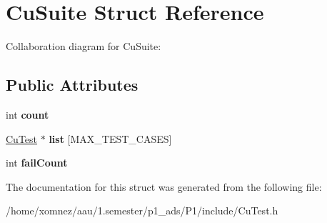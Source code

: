 \hypertarget{structCuSuite}{}\section{Cu\+Suite Struct Reference}
\label{structCuSuite}


Collaboration diagram for Cu\+Suite\+:
\subsection*{Public Attributes}
\begin{DoxyCompactItemize}
\item 
\mbox{\label{structCuSuite_a44b3a5aa4c9b027a6c680c78cdcb9da4}} 
int {\bfseries count}
\item 
\mbox{\label{structCuSuite_a16efbf8411fefbfe58e3c1f7f741241c}} 
\hyperlink{structCuTest}{Cu\+Test} $\ast$ {\bfseries list} \mbox{[}M\+A\+X\+\_\+\+T\+E\+S\+T\+\_\+\+C\+A\+S\+ES\mbox{]}
\item 
\mbox{\label{structCuSuite_ac768ec100a0423c8e9e9a0859c5c5dbd}} 
int {\bfseries fail\+Count}
\end{DoxyCompactItemize}


The documentation for this struct was generated from the following file\+:\begin{DoxyCompactItemize}
\item 
/home/xomnez/aau/1.\+semester/p1\+\_\+ads/\+P1/include/Cu\+Test.\+h\end{DoxyCompactItemize}
